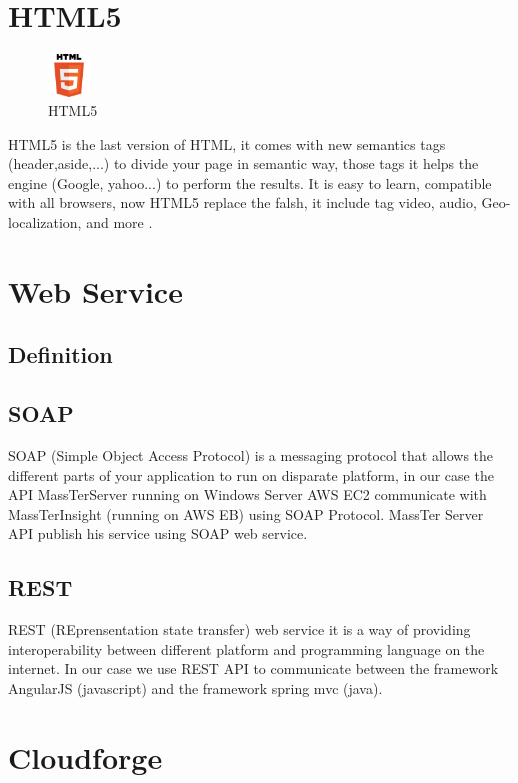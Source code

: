 \section{HTML5}
\begin{figure}[!h]
	\centering
	\includegraphics[width=0.1\textwidth]{HTML5_logo.png}
	\caption{HTML5}
\end{figure}
HTML5 is the last version of HTML, it comes with new semantics tags (header,aside,...) to divide your page in semantic way, those tags it helps the engine (Google, yahoo...) to perform the results. It is easy to learn, compatible with all browsers, now HTML5 replace the falsh, it include tag video, audio, Geo-localization, and more \cite{ref13}.
\section{Web Service}
\subsection{Definition}
\subsection{SOAP}
	SOAP (Simple Object Access Protocol) is a messaging protocol that allows the different parts of your application to run on disparate platform, in our case the API MassTerServer running on Windows Server AWS EC2 communicate with MassTerInsight (running on AWS EB) using SOAP Protocol.
	MassTer Server API publish his service using SOAP web service.   
\subsection{REST}
	REST (REprensentation state transfer) web service it is a way of providing interoperability between different platform and programming language on the internet.
	In our case we use REST API to communicate between the framework AngularJS (javascript) and the framework spring mvc (java). 
\section{Cloudforge}
